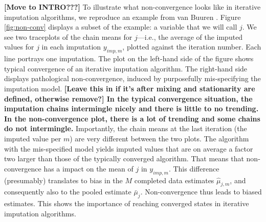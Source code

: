 \documentclass[Royal,times,sageh]{sagej}
\begin{document}
\textbf{{[}Move to INTRO???{]}} To illustrate what non-convergence looks like in iterative imputation algorithms, we reproduce an example from van Buuren \citeyearpar[\(\S\) 6.5.2]{buur18}. Figure \ref{fig:non-conv} displays a subset of the example: a variable that we will call \(j\). We see two traceplots of the chain means for \(j\)---i.e., the average of the imputed values for \(j\) in each imputation \(y_{imp,m}\), plotted against the iteration number. Each line portrays one imputation. The plot on the left-hand side of the figure shows typical convergence of an iterative imputation algorithm. The right-hand side displays pathological non-convergence, induced by purposefully mis-specifying the imputation model. \textbf{{[}Leave this in if it's after mixing and stationarity are defined, otherwise remove?{]} In the typical convergence situation, the imputation chains intermingle nicely and there is little to no trending. In the non-convergence plot, there is a lot of trending and some chains do not intermingle.} Importantly, the chain means at the last iteration (the imputed value per \(m\)) are very different between the two plots. The algorithm with the mis-specified model yields imputed values that are on average a factor two larger than those of the typically converged algorithm. That means that non-convergence has a impact on the mean of \(j\) in \(y_{imp, m}\). This difference (presumably) translates to bias in the \(M\) completed data estimates \(\hat{\mu}_{j,m}\), and consequently also to the pooled estimate \(\bar{\mu}_j\). Non-convergence thus leads to biased estimates. This shows the importance of reaching converged states in iterative imputation algorithms.
\end{document}
